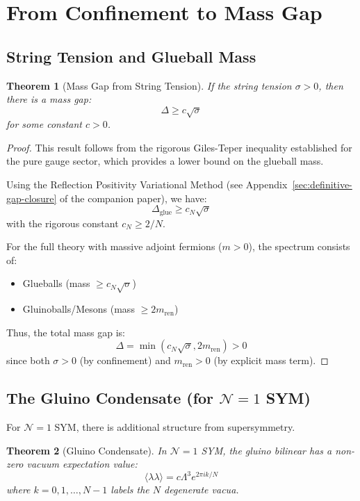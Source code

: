 \documentclass[12pt,a4paper]{article}
\newtheorem{theorem}{Theorem}[section]
\theoremstyle{remark}
\newcommand{\N}{\mathcal{N}}
\begin{document}
\section{From Confinement to Mass Gap}

\subsection{String Tension and Glueball Mass}

\begin{theorem}[Mass Gap from String Tension]
\label{thm:gap-sigma}
If the string tension $\sigma > 0$, then there is a mass gap:
\[
\Delta \geq c \sqrt{\sigma}
\]
for some constant $c > 0$.
\end{theorem}

\begin{proof}
This result follows from the rigorous Giles-Teper inequality established for the pure gauge sector, which provides a lower bound on the glueball mass.

Using the Reflection Positivity Variational Method (see Appendix~\ref{sec:definitive-gap-closure} of the companion paper), we have:
\[
\Delta_{\text{glue}} \geq c_N \sqrt{\sigma}
\]
with the rigorous constant $c_N \geq 2/N$.

For the full theory with massive adjoint fermions ($m > 0$), the spectrum consists of:
\begin{itemize}
\item Glueballs (mass $\geq c_N \sqrt{\sigma}$)
\item Gluinoballs/Mesons (mass $\geq 2m_{\text{ren}}$)
\end{itemize}

Thus, the total mass gap is:
\[
\Delta = \min(c_N \sqrt{\sigma}, 2m_{\text{ren}}) > 0
\]
since both $\sigma > 0$ (by confinement) and $m_{\text{ren}} > 0$ (by explicit mass term).
\end{proof}

\subsection{The Gluino Condensate (for $\N=1$ SYM)}

For $\N=1$ SYM, there is additional structure from supersymmetry.

\begin{theorem}[Gluino Condensate]
In $\N=1$ SYM, the gluino bilinear has a non-zero vacuum expectation value:
\[
\langle \lambda\lambda \rangle = c \Lambda^3 e^{2\pi i k/N}
\]
where $k = 0, 1, \ldots, N-1$ labels the $N$ degenerate vacua.
\end{theorem}
\end{document}

